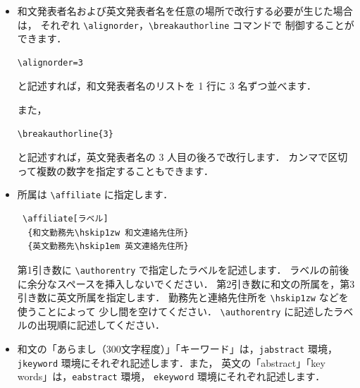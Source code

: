 \documentclass[technicalreport]{ieicej}
\begin{document}
\begin{itemize}
\begin{itemize}
\item
第3引き数は英文発表者名を指定します．
ファミリーネームは大文字で記述します．

\item
第4引き数は発表者の所属ラベルを指定します．
このラベルは，後述する \verb/\affiliate/ の第1引き数に対応します．
ラベルは大学名，企業名，地名などを表す簡潔なものにしてください．
複数の所属がある場合には，カンマ ``,'' でラベルを区切って記述します．

{\bfseries 発表者が一人で所属がない場合}は，
\texttt{none} と指定します．

{\bfseries 発表者が複数で所属のない方がいる場合}は，
\texttt{none} 以外の適当なラベルを付けたうえで，
\verb/\affiliate/ は記述しません．

ラベルの前後やカンマの後ろに余分なスペースを入れないでください．
\verb/{Tokyo}/ と \verb*/{Tokyo }/ は所属が違うものと判断します．
\end{itemize}

\item
和文発表者名および英文発表者名を任意の場所で改行する必要が生じた場合は，
それぞれ \verb/\alignorder/，\verb/\breakauthorline/ コマンドで
制御することができます．
\begin{verbatim}
\alignorder=3
\end{verbatim}
と記述すれば，和文発表者名のリストを 1 行に 3 名ずつ並べます．

また，
\begin{verbatim}
\breakauthorline{3}
\end{verbatim}
と記述すれば，英文発表者名の 3 人目の後ろで改行します．
カンマで区切って複数の数字を指定することもできます．

\item
所属は \verb/\affiliate/ に指定します．
\begin{verbatim}
 \affiliate[ラベル]
  {和文勤務先\hskip1zw 和文連絡先住所}
  {英文勤務先\hskip1em 英文連絡先住所}
\end{verbatim}
第1引き数に \verb/\authorentry/ で指定したラベルを記述します．
ラベルの前後に余分なスペースを挿入しないでください．
第2引き数に和文の所属を，第3引き数に英文所属を指定します．
勤務先と連絡先住所を \verb/\hskip1zw/ などを使うことによって
少し間を空けてください．
\verb/\authorentry/ に記述したラベルの出現順に記述してください．

\item
和文の「あらまし（300文字程度）」「キーワード」は，\texttt{jabstract} 環境，
\texttt{jkeyword} 環境にそれぞれ記述します．また，
英文の「abstract」「key words」は，\texttt{eabstract} 環境，
\texttt{ekeyword} 環境にそれぞれ記述します．
\end{itemize}
\end{document}
